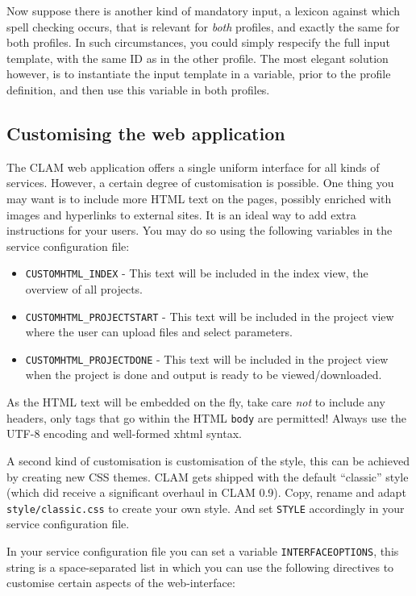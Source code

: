 \documentclass[a4paper,12pt]{report}
\begin{document}
Now suppose there is another kind of mandatory input, a lexicon against which
spell checking occurs, that is relevant for \emph{both} profiles, and exactly
the same for both profiles. In such circumstances, you could simply respecify
the full input template, with the same ID as in the other profile. The most
elegant solution however, is to instantiate the input template in a variable,
prior to the profile definition, and then use this variable in both profiles.

\subsection{Customising the web application}

The CLAM web application offers a single uniform interface for all kinds of
services. However, a certain degree of customisation is possible. One thing you
may want is to include more HTML text on the pages, possibly enriched with
images and hyperlinks to external sites. It is an ideal way to add extra
instructions for your users. You may do so using the following variables in the
service configuration file:


\begin{itemize}
\item \texttt{CUSTOMHTML\_INDEX} - This text will be included in the index view, the overview of all projects.
\item \texttt{CUSTOMHTML\_PROJECTSTART} - This text will be included in the project view where the user can upload files and select parameters.
\item \texttt{CUSTOMHTML\_PROJECTDONE} - This text will be included in the project view when the project is done and output is ready to be viewed/downloaded.
\end{itemize}

As the HTML text will be embedded on the fly, take care \emph{not} to include
any headers, only tags that go within the HTML \texttt{body} are permitted!
Always use the UTF-8 encoding and well-formed xhtml syntax.

A second kind of customisation is customisation of the style, this can be
achieved by creating new CSS themes. CLAM gets shipped with the default
``classic'' style (which did receive a significant overhaul in CLAM 0.9). Copy,
rename and adapt \texttt{style/classic.css} to create your own style. And set
\texttt{STYLE} accordingly in your service configuration file.

In your service configuration file you can set a variable
\texttt{INTERFACEOPTIONS}, this string is a space-separated list in which you
can use the following directives to customise certain aspects of the
web-interface:
\end{document}
